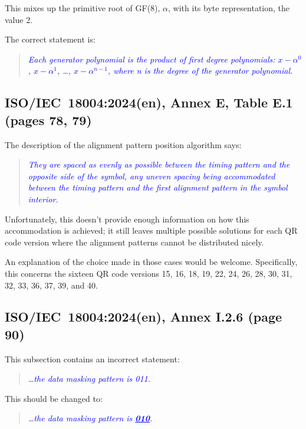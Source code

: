 \documentclass[a4paper,twoside]{article}
\newcommand{\shortstandard}{ISO/IEC~18004}
\newcommand{\standard}{\shortstandard:2024(en)}
\newcommand{\quotestandard}[1]{\textcolor{blue}{\textit{#1}}}
\newcommand{\ddd}{\dots}
\newcommand{\change}[1]{\underline{\textbf{#1}}}
\begin{document}
This mixes up the primitive root of GF(8), $\alpha$, with its byte representation, the value 2.

The correct statement is:

\begin{quote}
\quotestandard{Each generator polynomial is the product of first degree polynomials: \change{$x - \alpha^0$}, \change{$x - \alpha^1$}, \dots, \change{$x - \alpha^{n-1}$},
where n is the degree of the generator polynomial.}
\end{quote}

\subsection{\standard, Annex E, Table E.1 (pages 78, 79)}

The description of the alignment pattern position algorithm says:

\begin{quote}
\quotestandard{They are spaced as evenly as possible between the timing pattern and the opposite side of the symbol, any uneven
spacing being accommodated between the timing pattern and the first alignment pattern in the symbol interior.}
\end{quote}

Unfortunately, this doesn't provide enough information on how this accommodation is achieved; it still leaves multiple
possible solutions for each QR code version where the alignment patterns cannot be distributed nicely.

An explanation  of the choice made in those cases would be welcome. Specifically, this concerns the sixteen QR code versions
15, 16, 18, 19, 22, 24, 26, 28, 30, 31, 32, 33, 36, 37, 39, and 40.

\subsection{\standard, Annex I.2.6 (page 90)}
\label{sec:dmp-changed-2}

This subsection contains an incorrect statement:

\begin{quote}
\quotestandard{\ddd the data masking pattern is 011.}
\end{quote}

This should be changed to:

\begin{quote}
\quotestandard{\ddd the data masking pattern is \change{010}.}
\end{quote}
\end{document}
